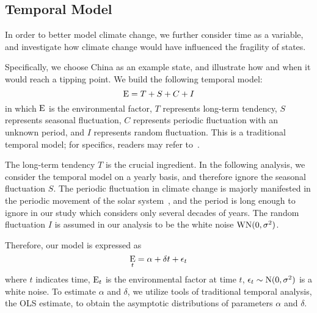 \subsection{Temporal Model}
In order to better model climate change, we further consider time as a variable, and investigate how climate change would have influenced the fragility of states. 

Specifically, we choose China as an example state, and illustrate how and when it would reach a tipping point. We build the following temporal model:
\begin{equation}
    \operatorname*{E} = T+S+C+I
   \label{eqn:model:temporal} 
\end{equation}
in which $\operatorname*{E}$ is the environmental factor, $T$ represents long-term tendency, $S$ represents seasonal fluctuation, $C$ represents periodic fluctuation with an unknown period, and $I$ represents random fluctuation. This is a traditional temporal model; for specifics, readers may refer to~.

The long-term tendency $T$ is the crucial ingredient. In the following analysis, we consider the temporal model on a yearly basis, and therefore ignore the seasonal fluctuation $S$. The periodic fluctuation in climate change is majorly manifested in the periodic movement of the solar system~, and the period is long enough to ignore in our study which considers only several decades of years. The random fluctuation $I$ is assumed in our analysis to be the white noise $\rm{WN}(0,\sigma^2)$.

Therefore, our model is expressed as 
\begin{equation}
    \operatorname*{E}_t = \alpha +\delta t +\epsilon_t
   \label{eqn:model:temporal:tend} 
\end{equation}
where $t$ indicates time, $\operatorname*{E}_t$ is the environmental factor at time $t$, $\epsilon_t \sim \rm{N}(0,\sigma^2)$ is a white noise. To estimate $\alpha$ and $\delta$, we utilize tools of traditional temporal analysis, the OLS estimate, to obtain the asymptotic distributions of parameters $\alpha$ and $\delta$.

